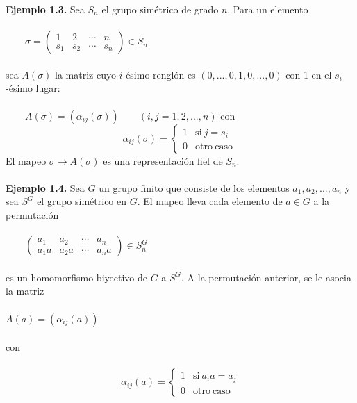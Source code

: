 \documentclass[12pt]{book}
\theoremstyle{definition}
\newcounter{in}
\newcounter{ini}
\begin{document}
\textbf{Ejemplo 1.3.} Sea $S_{n}$ el grupo simétrico de grado $n$. Para un elemento\\~\\
$\qquad 
\sigma = 
\begin{pmatrix}
1 & 2 & \cdots  & n\\ 
s_{1} & s_{2} & \cdots & s_{n}
\end{pmatrix} 
\in S_{n}$\\~\\
sea $A\left(\sigma\right)$ la matriz cuyo $i$-ésimo renglón es $\left(0,...,0,1,0,...,0\right)$ con 1 en el $s_{i}$-ésimo lugar:\\~\\
$\qquad
A\left(\sigma\right) = \left(\alpha_{ij}\left(\sigma\right)\right) 
\qquad
\left(i,j=1,2,...,n\right)
$
con
\begin{equation*}
         \alpha_{ij}\left(\sigma\right) = \left\{
	       \begin{array}{ll}
		 1      & \mathrm{si\ } j = s_{i} \\
		 0      & \mathrm{otro\ caso\ } 
	       \end{array}
	     \right.
\end{equation*}
El mapeo $\sigma \rightarrow A\left(\sigma\right)$ es una representación fiel de $S_{n}$.\\~\\
\textbf{Ejemplo 1.4.} Sea $G$ un grupo finito que consiste de los elementos $a_{1},a_{2},...,a_{n}$  y sea $S^{G}$ el grupo simétrico en $G$. El mapeo lleva cada elemento de $a \in G$ a la permutación\\~\\
$\qquad 
\begin{pmatrix}
a_{1} & a_{2} & \cdots  & a_{n}\\ 
a_{1}a & a_{2}a & \cdots & a_{n}a
\end{pmatrix} 
\in S_{n}^{G}$\\~\\
es un homomorfismo biyectivo de $G$ a $S^{G}$. A la permutación anterior, se le asocia la matriz\\~\\
$A\left(a\right)=\left(\alpha_{ij}\left(a\right)\right)$\\~\\
con\\~\\
\begin{equation*}
         \alpha_{ij}\left(a\right) = \left\{
	       \begin{array}{ll}
		 1      & \mathrm{si\ } a_{i}a = a_{j} \\
		 0      & \mathrm{otro\ caso\ } 
	       \end{array}
	     \right.
\end{equation*}
\end{document}
